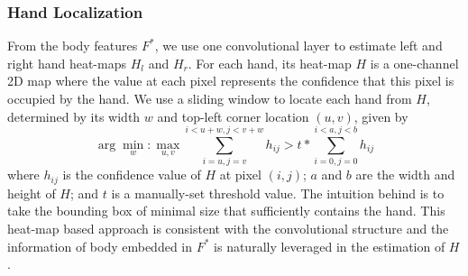 \documentclass[final]{cvpr}
\begin{document}
\subsubsection{Hand Localization \vspace{-1mm}}
From the body features $F^*$, we use one convolutional layer to estimate left and right hand heat-maps $H_l$ and $H_r$.
For each hand, its heat-map $H$ is a one-channel 2D map where the value at each pixel represents the confidence that this pixel is occupied by the hand.
We use a sliding window to locate each hand from $H$, determined by its width $w$ and top-left corner location $(u, v)$, given by
\begin{equation}
  \arg \min_w: \max_{u, v} \sum_{i=u, j=v}^{i<u+w, j<v+w}h_{ij} > t * \sum_{i=0,j=0}^{i<a, j<b} h_{ij}
  \label{eq:hand_loc}
\end{equation}
where $h_{ij}$ is the confidence value of $H$ at pixel $(i, j)$; $a$ and $b$ are the width and height of $H$; and $t$ is a manually-set threshold value.
The intuition behind is to take the bounding box of minimal size that sufficiently contains the hand.
This heat-map based approach is consistent with the convolutional structure and the information of body embedded in $F^*$ is naturally leveraged in the estimation of $H$.
\par
\vspace{-3mm}
\end{document}
